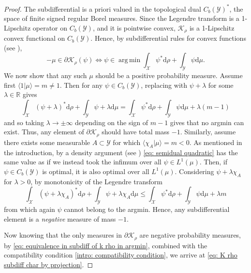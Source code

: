 \documentclass[11pt, oneside, titlepage]{book}
\theoremstyle{plain}
\theoremstyle{definition}
\newcommand{\R}{\mathbb{R}}
\newcommand{\K}{\mathcal{K}}
\newcommand{\X}{\mathcal{X}}
\newcommand{\Y}{\mathcal{Y}}
\newcommand{\di}{\mathrm{d}}
\DeclareMathOperator*{\argmin}{arg\,\min}
\begin{document}
\begin{proof}
    The subdifferential is a priori valued in the topological dual $C_b(\Y)^*$, the space of finite signed regular Borel measures. Since the Legendre transform is a 1-Lipschitz operator on $C_b(\Y)$, and it is pointwise convex, $\K_\rho$ is a 1-Lipschitz convex functional on $C_b(\Y)$. Hence, by subdifferential rules for convex functions (see \cite[Corollary 2.1]{attouch1986duality}),
\begin{equation}
\label{eq: equivalence in subdiff of k rho in argmin}
    -\mu \in \partial \K_\rho(\psi) \iff \psi \in \argmin \int_\X \psi^* \di \rho + \int_\Y \psi \di \mu.
\end{equation}
We now show that any such $\mu$ should be a positive probability measure. Assume first $\langle 1 | \mu \rangle = m \neq 1.$ Then for any $\psi \in C_b(\Y)$, replacing with $\psi +  \lambda$ for some $\lambda \in \R$ gives
\begin{equation*}
    \int_\X (\psi+ \lambda)^* \di \rho + \int_\Y \psi + \lambda \di \mu = \int_\X \psi^*  \di \rho + \int_\Y \psi \di \mu + \lambda(m -1)
\end{equation*}
and so taking $\lambda \to \pm \infty$ depending on the sign of $m-1$ gives that no argmin can exist. Thus, any element of $\partial \mathcal{K}_\rho$ should have total mass $-1$. Similarly, assume there exists some measurable $A \subset \Y$ for which $\langle \chi_A | \mu \rangle = m < 0$. As mentioned in the introduction, by a density argument (see \cite[Theorem 2.24]{rudin1987real}) \eqref{eq: semidual quadratic} has the same value as if we instead took the infimum over all $\psi \in L^1(\mu)$. Then, if $\psi \in C_b(\Y)$ is optimal, it is also optimal over all $L^1(\mu)$. Considering $\psi + \lambda \chi_A$ for $\lambda>0$, by monotonicity of the Legendre transform
\begin{equation*}
    \int_\X (\psi+ \lambda \chi_A)^* \di \rho + \int_\Y \psi + \lambda \chi_A \di \mu \leq \int_\X \psi^*  \di \rho + \int_\Y \psi \di \mu + \lambda m
\end{equation*}
from which again $\psi$ cannot belong to the argmin. Hence, any subdifferential element is a \textit{negative}  measure of mass $-1$.

Now knowing that the only measures in $\partial\K_\rho$ are negative probability measures, by \eqref{eq: equivalence in subdiff of k rho in argmin}, combined with the compatibility condition \eqref{intro: compatibility condition}, we arrive at \eqref{eq: K rho subdiff char by projection}.
\end{proof}
\end{document}
